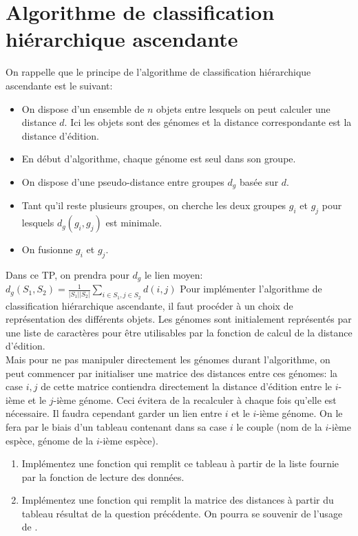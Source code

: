 \documentclass[a4paper, 10pt]{article}
\begin{document}
\section{Algorithme de classification hiérarchique ascendante}
On rappelle que le principe de l'algorithme de classification hiérarchique ascendante est le suivant:
\begin{itemize}
\item On dispose d'un ensemble de \(n\) objets entre lesquels on peut calculer une distance \(d\). Ici les objets sont des génomes et la distance correspondante est la distance d'édition.
\item En début d'algorithme, chaque génome est seul dans son groupe.
\item On dispose d'une pseudo-distance entre groupes \(d_g\) basée sur \(d\).
\item Tant qu'il reste plusieurs groupes, on cherche les deux groupes \(g_i\) et \(g_j\) pour lesquels \(d_g(g_i, g_j)\) est minimale.
\item On fusionne \(g_i\) et \(g_j\).
\end{itemize}
Dans ce TP, on prendra pour \(d_g\) le lien moyen: \(d_g(S_1, S_2) = \frac{1}{|S_1||S_2|}\sum\limits_{i\in S_1, j\in S_2}d(i, j)\)
Pour implémenter l'algorithme de classification hiérarchique ascendante, il faut procéder à un choix de représentation des différents objets. Les génomes sont initialement représentés par une liste de caractères pour être utilisables par la fonction de calcul de la distance d'édition.\\
Mais pour ne pas manipuler directement les génomes durant l'algorithme, on peut commencer par initialiser une matrice des distances entre ces génomes: la case \(i,j\) de cette matrice contiendra directement la distance d'édition entre le \(i\)-ième et le \(j\)-ième génome. Ceci évitera de la recalculer à chaque fois qu'elle est nécessaire. Il faudra cependant garder un lien entre \(i\) et le \(i\)-ième génome. On le fera par le biais d'un tableau contenant dans sa case \(i\) le couple (nom de la \(i\)-ième espèce, génome de la \(i\)-ième espèce).
\begin{enumerate}[resume]
\item Implémentez une fonction  qui remplit ce tableau à partir de la liste fournie par la fonction de lecture des données.
\item Implémentez une fonction  qui remplit la matrice des distances à partir du tableau résultat de la question précédente. On pourra se souvenir de l'usage de .
\end{enumerate}
\end{document}
